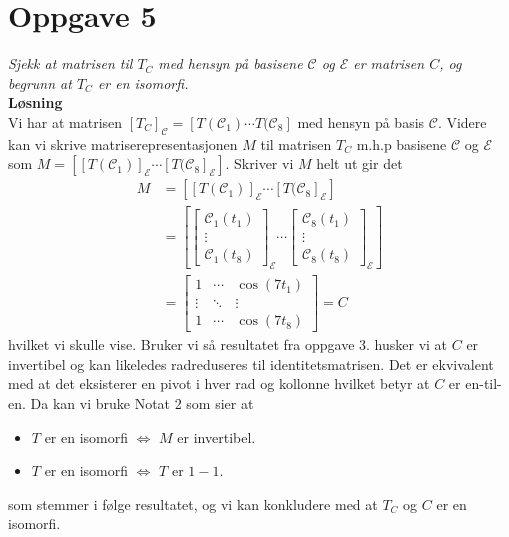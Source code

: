 \documentclass[12pt,
               a4paper,
               article,
               oneside,
               oldfontcommands,
               norsk]{memoir}
\begin{document}
\section*{Oppgave 5}
\emph{Sjekk at matrisen til $T_{C}$ med hensyn på basisene $\mathcal{C}$ og $\mathcal{E}$ er matrisen $C$, og begrunn at $T_{C}$ er en isomorfi.}\vspace{3mm}\\
\textbf{Løsning}\vspace{4mm}\\
Vi har at matrisen $[T_{C}]_\mathcal{C} = \left[ T(\mathcal{C}_1) \cdots T(\mathcal{C}_8 \right]$ med hensyn på basis $\mathcal{C}$. Videre kan vi skrive matriserepresentasjonen $M$ til matrisen $T_{C}$ m.h.p basisene $\mathcal{C}$ og $\mathcal{E}$ som $M = \left[ \left[T(\mathcal{C}_1) \right]_\mathcal{E} \cdots \left[T(\mathcal{C}_8 \right]_{\mathcal{E}} \right]$. Skriver vi $M$ helt ut gir det
\begin{align*}
M &= 
	\left[ \left[T(\mathcal{C}_1) \right]_\mathcal{E} \cdots 						\left[T(\mathcal{C}_8 \right]_{\mathcal{E}} \right]\\[5pt]
&=
	\left[ \begin{bmatrix}
	\mathcal{C}_1(t_1) \\
	\vdots \\
	\mathcal{C}_1(t_8) 
	\end{bmatrix}_{\mathcal{E}} 
	\cdots
	\begin{bmatrix}
	\mathcal{C}_{8}(t_1) \\
	\vdots\\
	\mathcal{C}_8(t_8)
	\end{bmatrix}_\mathcal{E}		
	\right] \\[5pt]
&=
	\begin{bmatrix}
	1 & \cdots & \cos(7t_1) \\[3pt]
	\vdots & \ddots & \vdots \\[3pt]
	1 & \cdots & \cos(7t_8)
	\end{bmatrix}
= C
\end{align*}
hvilket vi skulle vise. Bruker vi så resultatet fra oppgave 3. husker vi at $C$ er invertibel og kan likeledes radreduseres til identitetsmatrisen. Det er ekvivalent med at det eksisterer en pivot i hver rad og kollonne hvilket betyr at $C$ er en-til-en. Da kan vi bruke Notat 2 som sier at 
\begin{itemize}
\item $T$ er en isomorfi $\iff$ $M$ er invertibel.
\item  $T$ er en isomorfi $\iff$ $T$ er $1-1$.
\end{itemize}
som stemmer i følge resultatet, og vi kan konkludere med at $T_{C}$ og $C$ er en isomorfi.
\end{document}
